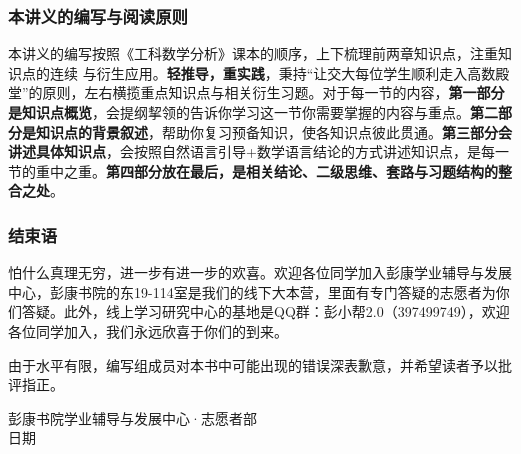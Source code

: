 \subsubsection{本讲义的编写与阅读原则}

本讲义的编写按照《工科数学分析》课本的顺序，上下梳理前两章知识点，注重知识点的连续
与衍生应用。\textbf{轻推导，重实践}，秉持“让交大每位学生顺利走入高数殿堂”的原则，左右横揽重点知识点与相关衍生习题。对于每一节的内容，\textbf{第一部分是知识点概览}，会提纲挈领的告诉你学习这一节你需要掌握的内容与重点。\textbf{第二部分是知识点的背景叙述}，帮助你复习预备知识，使各知识点彼此贯通。\textbf{第三部分会讲述具体知识点}，会按照自然语言引导+数学语言结论的方式讲述知识点，是每一节的重中之重。\textbf{第四部分放在最后，是相关结论、二级思维、套路与习题结构的整合之处}。

\subsubsection{结束语}
怕什么真理无穷，进一步有进一步的欢喜。欢迎各位同学加入彭康学业辅导与发展中心，彭康书院的东19-114室是我们的线下大本营，里面有专门答疑的志愿者为你们答疑。此外，线上学习研究中心的基地是QQ群：彭小帮2.0（397499749），欢迎各位同学加入，我们永远欣喜于你们的到来。


由于水平有限，编写组成员对本书中可能出现的错误深表歉意，并希望读者予以批评指正。

\vspace{3em}
\hfill\begin{minipage}{7cm}
	\begin{flushright}\kaiti
		彭康书院学业辅导与发展中心·志愿者部\\
		日期
	\end{flushright}
\end{minipage}